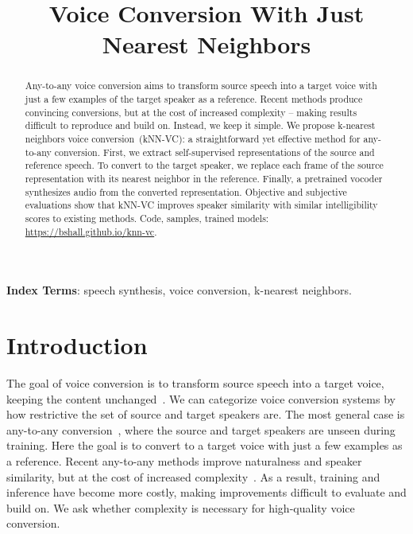 \documentclass{INTERSPEECH2023}
\title{Voice Conversion With Just Nearest Neighbors}
\def\modelname{{kNN-VC}}
\renewcommand{\thefootnote}{\fnsymbol{footnote}}
\begin{document}
\maketitle
\renewcommand{\thefootnote}{\fnsymbol{footnote}}
\ifinterspeechfinal
{}
\else
{}
\fi
\renewcommand*{\thefootnote}{\arabic{footnote}}
 
\begin{abstract}
Any-to-any voice conversion aims to transform source speech into a target voice with just a few examples of the target speaker as a reference.
Recent methods produce convincing conversions, but at the cost of increased complexity -- making results difficult to reproduce and build on.
Instead, we keep it simple.
We propose k-nearest neighbors voice conversion~\mbox{(kNN-VC)}: a straightforward yet effective method for any-to-any conversion.
First, we extract self-supervised representations of the source and reference speech. 
To convert to the target speaker, we replace each frame of the source representation with its nearest neighbor in the reference.
Finally, a pretrained vocoder synthesizes audio from the converted representation.
Objective and subjective evaluations show that \modelname{} improves speaker similarity with similar intelligibility scores to existing methods.
Code, samples, trained models: {\footnotesize \url{https://bshall.github.io/knn-vc}}.



\end{abstract}
\noindent\textbf{Index Terms}: speech synthesis, voice conversion, k-nearest neighbors.




\section{Introduction}



The goal of voice conversion is to transform source speech into a target voice, keeping the content unchanged~\cite{Mohammadi2017vc_def}.
We can categorize voice conversion systems by how restrictive the set of source and target speakers are.
The most general case is any-to-any conversion~\cite{vc_categories_liu2021any}, where the source and target speakers are unseen during training.
Here the goal is to convert to a target voice with just a few examples as a reference.
Recent any-to-any methods improve naturalness and speaker similarity, but at the cost of increased complexity~\cite{vcc2020, freevc}.
As a result, training and inference have become more costly, making improvements difficult to evaluate and build on.
We ask whether complexity is necessary for high-quality voice conversion.
\end{document}
